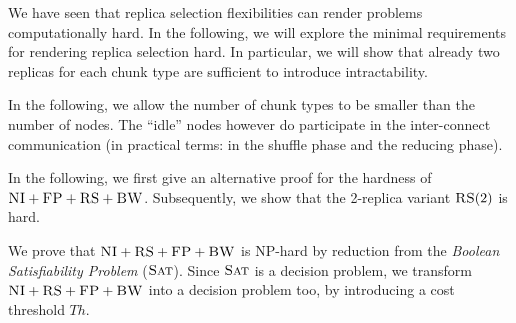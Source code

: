 \documentclass[9pt]{sigcomm-alternate}
\newcommand{\maciek}[1]{\textcolor{brown}{maciek: #1}}
\newcommand{\CC}{\textsc{NI}}
\newcommand{\FP}{\textsc{FP}}
\newcommand{\RS}{\textsc{RS}}
\newcommand{\BW}{\textsc{BW}}
\newcommand{\MA}{\textsc{MA}}
\newcommand{\SAT}{\textsc{Sat}}
\newcommand{\Thr}{\ensuremath{Th}}
\begin{document}
\begin{appendix}
We have seen that replica selection flexibilities can render problems computationally hard.
In the following, we will explore the minimal requirements for rendering replica selection hard.
In particular, we will show that already two replicas for each chunk type are sufficient to
introduce intractability.

In the following, we allow the number of chunk types to be smaller than the number of nodes.
 The ``idle'' nodes however do participate in the inter-connect communication (in practical terms: in the shuffle phase
 and the reducing phase).



In the following, we first give an alternative proof for the hardness of $\CC+\FP+\RS+\BW$.
Subsequently, we show that the 2-replica variant $\RS(2)$ is hard.



We prove that $\CC+\RS+\FP+\BW$ is NP-hard by reduction from the \emph{Boolean Satisfiability Problem} ($\SAT$).
Since $\SAT$ is a decision
problem, we transform $\CC+\RS+\FP+\BW$ into a decision problem too, by
introducing a cost threshold $\Thr$.


\end{appendix}
\end{document}
